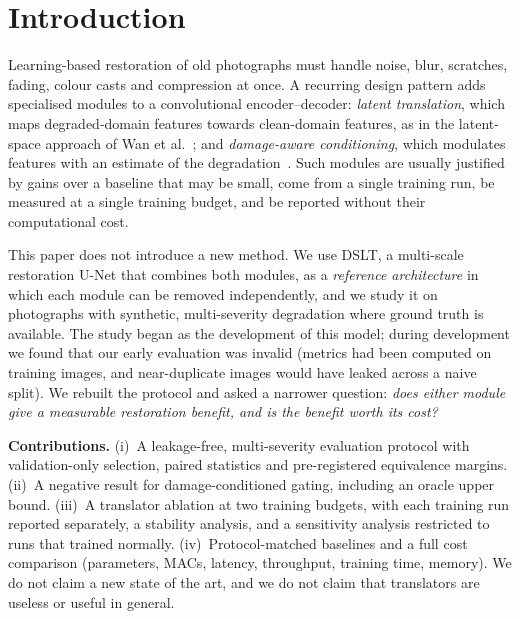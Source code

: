 \documentclass[conference]{IEEEtran}
\newcommand{\method}{DSLT}
\begin{document}
\section{Introduction}
Learning-based restoration of old photographs must handle noise, blur, scratches, fading, colour casts and
compression at once. A recurring design pattern adds specialised modules to a convolutional encoder--decoder:
\emph{latent translation}, which maps degraded-domain features towards clean-domain features, as in the
latent-space approach of Wan et al.~\cite{wan2020bringing,wan2023tpami}; and \emph{damage-aware conditioning},
which modulates features with an estimate of the degradation~\cite{perez2018film,wang2018sft}. Such modules are
usually justified by gains over a baseline that may be small, come from a single training run, be measured at a
single training budget, and be reported without their computational cost.

This paper does not introduce a new method. We use \method{}, a multi-scale restoration U-Net that combines both
modules, as a \emph{reference architecture} in which each module can be removed independently, and we study it on
photographs with synthetic, multi-severity degradation where ground truth is available. The study began as the
development of this model; during development we found that our early evaluation was invalid (metrics had been
computed on training images, and near-duplicate images would have leaked across a naive split). We rebuilt the
protocol and asked a narrower question: \emph{does either module give a measurable restoration benefit, and is the
benefit worth its cost?}

\textbf{Contributions.}
(i)~A leakage-free, multi-severity evaluation protocol with validation-only selection, paired statistics and
pre-registered equivalence margins.
(ii)~A negative result for damage-conditioned gating, including an oracle upper bound.
(iii)~A translator ablation at two training budgets, with each training run reported separately, a stability
analysis, and a sensitivity analysis restricted to runs that trained normally.
(iv)~Protocol-matched baselines and a full cost comparison (parameters, MACs, latency, throughput, training time,
memory).
We do not claim a new state of the art, and we do not claim that translators are useless or useful in general.
\end{document}
